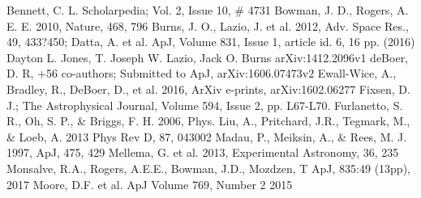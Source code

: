 \documentclass[12pt]{amsart}
\begin{document}

\clearpage
%
%
%
%

\singlespace
\begin{thebibliography}{}
Bennett, C. L. Scholarpedia; Vol. 2, Issue 10, \# 4731
Bowman, J. D.,  Rogers, A. E. E. 2010, Nature, 468, 796
Burns, J. O., Lazio, J. et al. 2012,  Adv. Space Res., 49, 433?450;
Datta, A. et al. ApJ, Volume 831, Issue 1, article id. 6, 16 pp. (2016)
Dayton L. Jones, T. Joseph W. Lazio, Jack O. Burns
 arXiv:1412.2096v1
deBoer, D. R, +56 co-authors; Submitted to ApJ, arXiv:1606.07473v2
Ewall-Wice, A., Bradley, R., DeBoer, D., et al. 2016, ArXiv e-prints, arXiv:1602.06277
Fixsen, D. J.; The Astrophysical Journal, Volume 594, Issue 2, pp. L67-L70.
Furlanetto, S. R., Oh, S. P., \& Briggs, F. H. 2006, Phys.
Liu, A., Pritchard, J.R., Tegmark, M., \& Loeb, A. 2013
Phys Rev D, 87, 043002
Madau, P., Meiksin, A., \& Rees, M. J. 1997, ApJ, 475, 429
Mellema, G. et al. 2013,
Experimental Astronomy, 36, 235
Monsalve, R.A., Rogers, A.E.E., Bowman, J.D., Mozdzen, T 
 ApJ, 835:49 (13pp), 2017 
 Moore, D.F. et al. ApJ Volume 769, Number 2 2015

\end{thebibliography}
\end{document}
